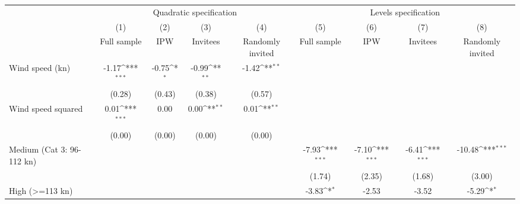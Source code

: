 {
\def\sym#1{\ifmmode^{#1}\else\(^{#1}\)\fi}
\begin{tabular}{l*{8}{c}}
\toprule
                    &\multicolumn{4}{c}{Quadratic specification}                                            &\multicolumn{4}{c}{Levels specification}                                               \\\cmidrule(lr){2-5}\cmidrule(lr){6-9}
                    &\multicolumn{1}{c}{(1)}&\multicolumn{1}{c}{(2)}&\multicolumn{1}{c}{(3)}&\multicolumn{1}{c}{(4)}&\multicolumn{1}{c}{(5)}&\multicolumn{1}{c}{(6)}&\multicolumn{1}{c}{(7)}&\multicolumn{1}{c}{(8)}\\
                    &\multicolumn{1}{c}{Full sample}&\multicolumn{1}{c}{IPW}&\multicolumn{1}{c}{Invitees}&\multicolumn{1}{c}{Randomly invited}&\multicolumn{1}{c}{Full sample}&\multicolumn{1}{c}{IPW}&\multicolumn{1}{c}{Invitees}&\multicolumn{1}{c}{Randomly invited}\\
\midrule
Wind speed (kn)     &       -1.17\sym{***}&       -0.75\sym{*}  &       -0.99\sym{**} &       -1.42\sym{**} &                     &                     &                     &                     \\
                    &      (0.28)         &      (0.43)         &      (0.38)         &      (0.57)         &                     &                     &                     &                     \\
Wind speed squared  &        0.01\sym{***}&        0.00         &        0.00\sym{**} &        0.01\sym{**} &                     &                     &                     &                     \\
                    &      (0.00)         &      (0.00)         &      (0.00)         &      (0.00)         &                     &                     &                     &                     \\
Medium (Cat 3: 96-112 kn)&                     &                     &                     &                     &       -7.93\sym{***}&       -7.10\sym{***}&       -6.41\sym{***}&      -10.48\sym{***}\\
                    &                     &                     &                     &                     &      (1.74)         &      (2.35)         &      (1.68)         &      (3.00)         \\
High (>=113 kn)     &                     &                     &                     &                     &       -3.83\sym{*}  &       -2.53         &       -3.52         &       -5.29\sym{*}  \\

\end{tabular}}
